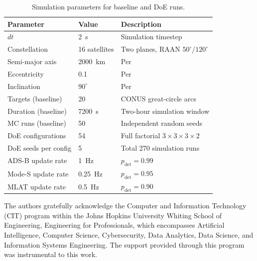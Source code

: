 \documentclass[]{spie}
\begin{document}
\begin{table}[h]
\caption{Simulation parameters for baseline and DoE runs.}
\label{tab:params}
\centering
\begin{tabular}{lll}
\toprule
Parameter & Value & Description \\
\midrule
$dt$ & 2~s & Simulation timestep \\
Constellation & 16 satellites & Two planes, RAAN $50^\circ$/$120^\circ$ \\
Semi-major axis & 2000~km & Per~\cite{Saeed2026GoDSATRL} \\
Eccentricity & 0.1 & Per~\cite{Saeed2026GoDSATRL} \\
Inclination & $90^\circ$ & Per~\cite{Saeed2026GoDSATRL} \\
Targets (baseline) & 20 & CONUS great-circle arcs \\
Duration (baseline) & 7200~s & Two-hour simulation window \\
MC runs (baseline) & 50 & Independent random seeds \\
DoE configurations & 54 & Full factorial $3 \times 3 \times 3 \times 2$ \\
DoE seeds per config & 5 & Total 270 simulation runs \\
ADS-B update rate & 1~Hz & $p_{\mathrm{det}} = 0.99$~\cite{adsb_faa} \\
Mode-S update rate & 0.25~Hz & $p_{\mathrm{det}} = 0.95$ \\
MLAT update rate & 0.5~Hz & $p_{\mathrm{det}} = 0.90$~\cite{opensky} \\
\bottomrule
\end{tabular}
\end{table}

\acknowledgments

The authors gratefully acknowledge the Computer and Information Technology (CIT) program within the Johns Hopkins University Whiting School of Engineering, Engineering for Professionals, which encompasses Artificial Intelligence, Computer Science, Cybersecurity, Data Analytics, Data Science, and Information Systems Engineering. The support provided through this program was instrumental to this work.



\end{document}
